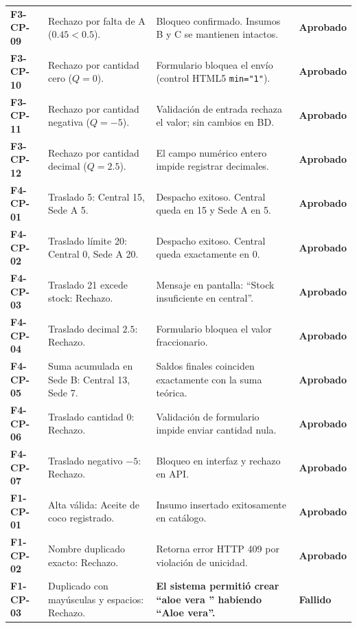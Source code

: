 \documentclass[11pt,a4paper]{article}
\begin{document}
\begin{longtable}{p{1.6cm} p{3.4cm} p{7.8cm} p{2.2cm}}
\textbf{F3-CP-09} & Rechazo por falta de A ($0.45 < 0.5$). & Bloqueo confirmado. Insumos B y C se mantienen intactos. & \textbf{\textcolor{accentgreen}{Aprobado}} \\
\textbf{F3-CP-10} & Rechazo por cantidad cero ($Q=0$). & Formulario bloquea el envío (control HTML5 \texttt{min="1"}). & \textbf{\textcolor{accentgreen}{Aprobado}} \\
\textbf{F3-CP-11} & Rechazo por cantidad negativa ($Q=-5$). & Validación de entrada rechaza el valor; sin cambios en BD. & \textbf{\textcolor{accentgreen}{Aprobado}} \\
\textbf{F3-CP-12} & Rechazo por cantidad decimal ($Q=2.5$). & El campo numérico entero impide registrar decimales. & \textbf{\textcolor{accentgreen}{Aprobado}} \\
\textbf{F4-CP-01} & Traslado 5: Central 15, Sede A 5. & Despacho exitoso. Central queda en 15 y Sede A en 5. & \textbf{\textcolor{accentgreen}{Aprobado}} \\
\textbf{F4-CP-02} & Traslado límite 20: Central 0, Sede A 20. & Despacho exitoso. Central queda exactamente en 0. & \textbf{\textcolor{accentgreen}{Aprobado}} \\
\textbf{F4-CP-03} & Traslado 21 excede stock: Rechazo. & Mensaje en pantalla: ``Stock insuficiente en central''. & \textbf{\textcolor{accentgreen}{Aprobado}} \\
\textbf{F4-CP-04} & Traslado decimal $2.5$: Rechazo. & Formulario bloquea el valor fraccionario. & \textbf{\textcolor{accentgreen}{Aprobado}} \\
\textbf{F4-CP-05} & Suma acumulada en Sede B: Central 13, Sede 7. & Saldos finales coinciden exactamente con la suma teórica. & \textbf{\textcolor{accentgreen}{Aprobado}} \\
\textbf{F4-CP-06} & Traslado cantidad 0: Rechazo. & Validación de formulario impide enviar cantidad nula. & \textbf{\textcolor{accentgreen}{Aprobado}} \\
\textbf{F4-CP-07} & Traslado negativo $-5$: Rechazo. & Bloqueo en interfaz y rechazo en API. & \textbf{\textcolor{accentgreen}{Aprobado}} \\
\textbf{F1-CP-01} & Alta válida: Aceite de coco registrado. & Insumo insertado exitosamente en catálogo. & \textbf{\textcolor{accentgreen}{Aprobado}} \\
\textbf{F1-CP-02} & Nombre duplicado exacto: Rechazo. & Retorna error HTTP 409 por violación de unicidad. & \textbf{\textcolor{accentgreen}{Aprobado}} \\
\textbf{F1-CP-03} & Duplicado con mayúsculas y espacios: Rechazo. & \textbf{El sistema permitió crear ``aloe vera '' habiendo ``Aloe vera''.} & \textbf{\textcolor{accentred}{Fallido}} \\

\end{longtable}
\end{document}
